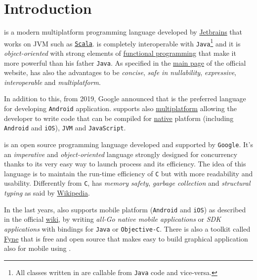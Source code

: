\section{Introduction}

\Kotlin is a modern multiplatform programming language developed by \href{https://www.jetbrains.com/}{Jetbrains} that works on JVM such as \href{www.scala-lang.org}{\texttt{Scala}}.
\Kotlin is completely interoperable with \texttt{Java}\footnote{All classes written in \Kotlin are callable from \texttt{Java} code and vice-versa.} and it is \textit{object-oriented} with strong elements of \href{https://en.wikipedia.org/wiki/Functional_programming}{functional programming} that make it more powerful than his father \texttt{Java}.
As specified in the \href{https://kotlinlang.org/#why-kotlin}{main page} of the official website, \Kotlin has also the advantages to be \textit{concise}, \textit{safe in nullability}, \textit{expressive}, \textit{interoperable} and \textit{multiplatform}.

In addition to this, from 2019, Google announced that \Kotlin is the preferred language for developing  \texttt{Android} application. \Kotlin supports also \href{https://kotlinlang.org/docs/multiplatform.html}{multiplatform} allowing the developer to write \Kotlin code that can be compiled for \href{https://kotlinlang.org/docs/native-overview.html}{native} platform (including \texttt{Android} and \texttt{iOS}), \texttt{JVM} and \texttt{JavaScript}.

\Go is an open source programming language developed and supported by \texttt{Google}.
It's an \textit{imperative} and \textit{object-oriented} language strongly designed for concurrency thanks to its very easy way to launch process and its efficiency.
The idea of this language is to maintain the run-time efficiency of \texttt{C} but with more readability and usability. Differently from \texttt{C}, \Go has \textit{memory safety}, \textit{garbage collection} and \textit{structural typing} as said by \href{https://en.wikipedia.org/wiki/Go_(programming_language)}{Wikipedia}.

In the last years, \Go also supports mobile platform (\texttt{Android} and \texttt{iOS}) as described in the official \href{https://github.com/golang/go/wiki/Mobile}{wiki}, by writing \textit{all-Go native mobile applications} or \textit{SDK applications} with bindings for \texttt{Java} or \texttt{Objective-C}.
There is also a toolkit called \href{https://fyne.io/}{Fyne} that is free and open source that makes easy to build graphical application also for mobile using \Go.

